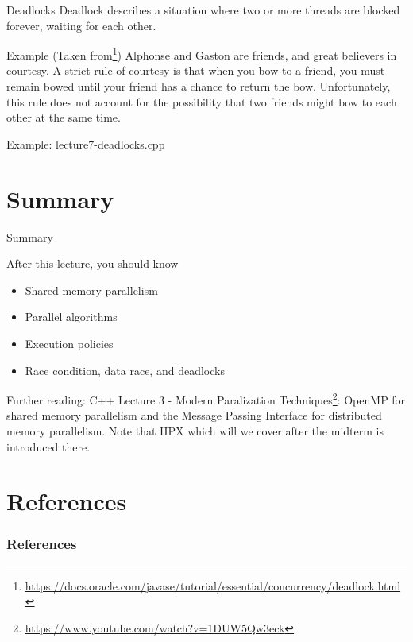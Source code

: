 \documentclass[12pt,t]{beamer}
\begin{document}
\begin{frame}{Deadlocks}
Deadlock describes a situation where two or more threads are blocked forever, waiting for each other.

\begin{block}{Example (Taken from\footnote{\tiny{\url{https://docs.oracle.com/javase/tutorial/essential/concurrency/deadlock.html}}})}
Alphonse and Gaston are friends, and great believers in courtesy. A strict rule of courtesy is that when you bow to a friend, you must remain bowed until your friend has a chance to return the bow. Unfortunately, this rule does not account for the possibility that two friends might bow to each other at the same time.
\end{block}
\vspace{1cm}
Example: lecture7-deadlocks.cpp

\end{frame}



\section{Summary}
\begin{frame}{Summary}
\begin{block}{After this lecture, you should know}
\begin{itemize}
\item Shared memory parallelism
\item Parallel algorithms
\item Execution policies
\item Race condition, data race, and deadlocks
\end{itemize}
\end{block}

\begin{block}{Further reading:}
C++ Lecture 3 - Modern Paralization Techniques\footnote{\tiny\url{https://www.youtube.com/watch?v=1DUW5Qw3eck}}: OpenMP for shared memory parallelism and the Message Passing Interface for distributed memory parallelism. Note that HPX which will we cover after the midterm is introduced there.
\end{block}

\end{frame}




\section{References}

\begin{frame}[t, allowframebreaks]
\frametitle{References}


\end{frame}
\end{document}
